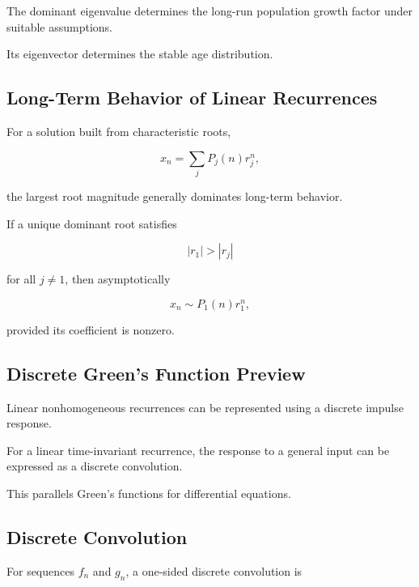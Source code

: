 The dominant eigenvalue determines the long-run population growth factor
under suitable assumptions.

Its eigenvector determines the stable age distribution.

\subsection{Long-Term Behavior of Linear Recurrences}
\label{subsec:long-term-linear-recurrence}

For a solution built from characteristic roots,

\[
x_n
=
\sum_j
P_j(n)r_j^n,
\]

the largest root magnitude generally dominates long-term behavior.

If a unique dominant root satisfies

\[
|r_1|>|r_j|
\]

for all \(j\neq1\), then asymptotically

\[
\boxed{
x_n
\sim
P_1(n)r_1^n,
}
\]

provided its coefficient is nonzero.

\subsection{Discrete Green's Function Preview}
\label{subsec:discrete-greens-function-preview}

Linear nonhomogeneous recurrences can be represented using a discrete
impulse response.

For a linear time-invariant recurrence, the response to a general input
can be expressed as a discrete convolution.

This parallels Green's functions for differential equations.

\subsection{Discrete Convolution}
\label{subsec:discrete-convolution}

For sequences \(f_n\) and \(g_n\), a one-sided discrete convolution is

